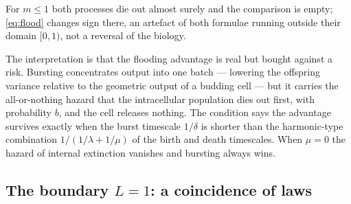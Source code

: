 For $m\le1$ both processes die out almost surely and the comparison is
empty; \eqref{eq:flood} changes sign there, an artefact of both formulae
running outside their domain $[0,1)$, not a reversal of the biology.


The interpretation is that the flooding advantage is real but bought
against a risk. Bursting concentrates output into one batch --- lowering
the offspring variance relative to the geometric output of a budding cell
--- but it carries the all-or-nothing hazard that the intracellular
population dies out first, with probability $b$, and the cell releases
nothing. The condition says the advantage survives exactly when the burst
timescale $1/\delta$ is shorter than the harmonic-type combination
$1/(1/\lambda+1/\mu)$ of the birth and death timescales. When $\mu=0$ the
hazard of internal extinction vanishes and bursting always wins.

\subsection{The boundary $L=1$: a coincidence of laws}

